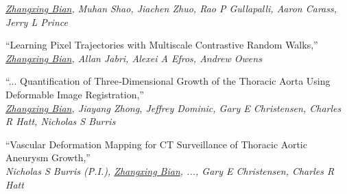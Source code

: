 \begin{cventries}
{\begin{cvitems}
{       \textit{\underline{Zhangxing Bian}, Muhan Shao, Jiachen Zhuo, Rao P Gullapalli, Aaron Carass, Jerry L Prince}}
%
\item {``Learning Pixel Trajectories with Multiscale Contrastive Random Walks,''  \\
       \textit{\underline{Zhangxing Bian}, Allan Jabri, Alexei A Efros, Andrew Owens}}
%
%
\item {``... Quantification of Three‐Dimensional Growth of the Thoracic Aorta Using Deformable Image Registration,''  \\
       \textit{\underline{Zhangxing Bian}, Jiayang Zhong, Jeffrey Dominic, Gary E Christensen, Charles R Hatt, Nicholas S Burris}}
%
\item {``Vascular Deformation Mapping for CT Surveillance of Thoracic Aortic Aneurysm Growth,''  \\
       \textit{Nicholas S Burris (P.I.), \underline{Zhangxing Bian}, ..., Gary E Christensen, Charles R Hatt}}
%
%
      \end{cvitems}
    }
    

\end{cventries}



